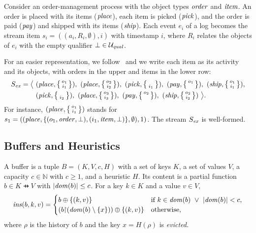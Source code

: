 \begin{example}
\label{ex:running}
Consider an order-management process with the object types $\mathit{order}$ and $\mathit{item}$. An order is placed with its items ($\mathit{place}$), each item is picked ($\mathit{pick}$), and the order is paid ($\mathit{pay}$) and shipped with its items ($\mathit{ship}$). Each event $e_i$ of a log becomes the stream item $s_i = ((a_i, R_i, \emptyset), i)$ with timestamp $i$, where $R_i$ relates the objects of $e_i$ with the empty qualifier $\bot \in \mathcal{U}_{\mathit{qual}}$.

For an easier representation, we follow~\cite{Muehlmeyer2026} and we write each item as its activity and its objects, with orders in the upper and items in the lower row:
\[
\begin{aligned}
  S_{\mathit{ex}} = \bigl\langle\
  & (\mathit{place}, \left\{\begin{smallmatrix} o_1 \\ i_1 \end{smallmatrix}\right\}),\
    (\mathit{place}, \left\{\begin{smallmatrix} o_2 \\ i_2 \end{smallmatrix}\right\}),\
    (\mathit{pick}, \left\{\begin{smallmatrix} \phantom{o_1} \\ i_1 \end{smallmatrix}\right\}),\
    (\mathit{pay}, \left\{\begin{smallmatrix} o_1 \\ \phantom{i_1} \end{smallmatrix}\right\}),\
    (\mathit{ship}, \left\{\begin{smallmatrix} o_1 \\ i_1 \end{smallmatrix}\right\}),\\
  & (\mathit{pick}, \left\{\begin{smallmatrix} \phantom{o_1} \\ i_2 \end{smallmatrix}\right\}),\
    (\mathit{place}, \left\{\begin{smallmatrix} o_3 \\ i_3 \end{smallmatrix}\right\}),\
    (\mathit{pay}, \left\{\begin{smallmatrix} o_2 \\ \phantom{i_2} \end{smallmatrix}\right\}),\
    (\mathit{ship}, \left\{\begin{smallmatrix} o_2 \\ i_2 \end{smallmatrix}\right\})\ \bigr\rangle.
\end{aligned}
\]
For instance, $(\mathit{place}, \left\{\begin{smallmatrix} o_1 \\ i_1 \end{smallmatrix}\right\})$ stands for
$s_1 = ((\mathit{place}, \{(o_1, \mathit{order}, \bot), (i_1, \mathit{item}, \bot)\},
\emptyset), 1)$.
The stream $S_{\mathit{ex}}$ is well-formed.
\end{example}

\subsection{Buffers and Heuristics}
\label{sec:framework:buffers}

\begin{definition}[Buffer]
\label{def:buffer}
A buffer is a tuple $B = (K, V, c, H)$ with a set of keys $K$, a set of
values $V$, a capacity $c \in \mathbb{N}$ with $c \ge 1$, and a heuristic $H$.
Its content is a partial function $b \in K \pfun V$ with
$|\mathit{dom}(b)| \le c$.
For a key $k \in K$ and a value $v \in V$,
\[
  \mi{ins}(b, k, v) =
  \begin{cases}
    b \oplus \{(k, v)\} & \text{if } k \in \mi{dom}(b) \ \vee\ |\mi{dom}(b)| < c,\\
    (b \restr (\mi{dom}(b) \setminus \{x\})) \oplus \{(k, v)\}
      & \text{otherwise,}
  \end{cases}
\]
where $\rho$ is the history of $b$ and the key $x = H(\rho)$ is \emph{evicted}.
\end{definition}

